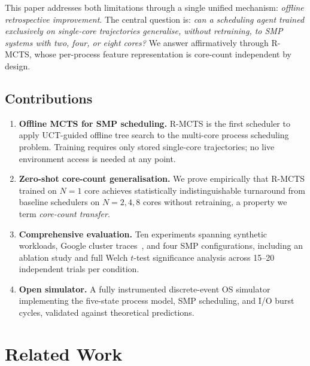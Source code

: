 \documentclass[10pt,journal,compsoc]{IEEEtran}
\begin{document}
This paper addresses both limitations through a single unified mechanism:
\emph{offline retrospective improvement}. The central question is:
\emph{can a scheduling agent trained exclusively on single-core
trajectories generalise, without retraining, to SMP systems with two,
four, or eight cores?}
We answer affirmatively through R-MCTS, whose per-process feature
representation is core-count independent by design.

\subsection{Contributions}

\begin{enumerate}
  \item \textbf{Offline MCTS for SMP scheduling.}
    R-MCTS is the first scheduler to apply UCT-guided offline tree search
    to the multi-core process scheduling problem.
    Training requires only stored single-core trajectories; no live
    environment access is needed at any point.

  \item \textbf{Zero-shot core-count generalisation.}
    We prove empirically that R-MCTS trained on $N{=}1$ core achieves
    statistically indistinguishable turnaround from baseline schedulers
    on $N{=}2,4,8$ cores without retraining, a property we term
    \emph{core-count transfer}.

  \item \textbf{Comprehensive evaluation.}
    Ten experiments spanning synthetic workloads, Google cluster
    traces~\cite{reiss2011google}, and four SMP configurations,
    including an ablation study and full Welch $t$-test significance
    analysis across 15--20 independent trials per condition.

  \item \textbf{Open simulator.}
    A fully instrumented discrete-event OS simulator implementing the
    five-state process model, SMP scheduling, and I/O burst cycles,
    validated against theoretical predictions.
\end{enumerate}

\section{Related Work}
\label{sec:related}
\end{document}
